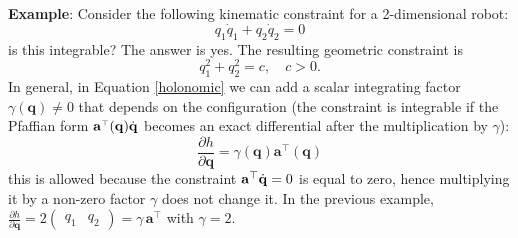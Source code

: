 \documentclass[10pt, a4paper]{report}
\newcommand{\q}{{\mathbf q}}
\begin{document}
\noindent\textbf{Example}: Consider the following kinematic constraint for a 2-dimensional robot:\begin{equation}
     q_1\dot q_1+q_2\dot q_2=0
\end{equation}
is this integrable? The answer is yes. The resulting geometric constraint is\begin{equation}
    q_1^2+q_2^2=c, \quad c>0.
\end{equation}
In general, in Equation \eqref{holonomic} we can add a scalar integrating factor $\gamma(\q)\neq 0$ that depends on the configuration (the constraint is integrable if the Pfaffian form $\mathbf a^{\scriptscriptstyle\top}(\q)\dq$ becomes an exact differential after the multiplication by $\gamma$):
\begin{equation}
    \frac{\partial h}{\partial \q}=\gamma(\q)\mathbf a^\top(\q)
\end{equation}
this is allowed because the constraint $\mathbf a^\top{\dot{\mathbf q}}=0$ is equal to zero, hence multiplying it by a non-zero factor $\gamma$ does not change it. In the previous example, $\frac{\partial h}{\partial \q}=2\begin{pmatrix}q_1&q_2\end{pmatrix}=\gamma\,\mathbf a^\top$ with $\gamma=2$.
\end{document}
